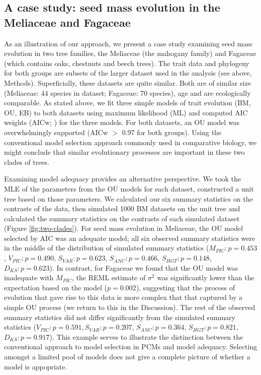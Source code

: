 \documentclass[a4paper,12pt]{article}
\begin{document}
\subsection{A case study: seed mass evolution in the Meliaceae and Fagaceae }
As an illustration of our approach, we present a case study examining seed mass evolution in two tree families, the Meliaceae (the mahogany family) and Fagaceae (which contains oaks, chestnuts and beech trees). The trait data and phylogeny for both groups are subsets of the larger dataset used in the analysis (see above, Methods). Superficially, these datasets are quite similar. Both are of similar size (Meliaceae: 44 species in dataset; Fagaceae: 70 species), age and are ecologically comparable. As stated above, we fit three simple models of trait evolution (BM, OU, EB) to both datasets using maximum likelihood (ML) and computed AIC weights (AICw; \citep{Akaike1974, aicweight}) for the three models. For both datasets, an OU model was overwhelmingly supported (AICw $>$ 0.97 for both groups). Using the conventional model selection approach commonly used in comparative biology, we might conclude that similar evolutionary processes are important in these two clades of trees.

Examining model adequacy provides an alternative perspective. We took the MLE of the parameters from the OU models for each dataset, constructed a unit tree based on those parameters. We calculated our six summary statistics on the contrasts of the data, then simulated 1000 BM datasets on the unit tree and calculated the summary statistics on the contrasts of each simulated dataset (Figure \ref{fig:two-clades}). For seed mass evolution in Meliaceae, the OU model selected by AIC was an adequate model; all six observed summary statistics were in the middle of the distribution of simulated summary statistics ($M_{PIC}: p=0.453$, $V_{PIC}: p=0.490$, $S_{VAR}: p=0.623$, $S_{ANC}:p=0.466$, $S_{HGT}: p=0.148$, $D_{KS}: p=0.623$). In contrast, for Fagaceae we found that the OU model was inadequate with $M_{PIC}$, the REML estimate of $\sigma^2$ was significantly lower than the expectation based on the model ($p=0.002$), suggesting that the process of evolution that gave rise to this data is more complex that that captured by a simple OU process (we return to this in the Discussion).  The rest of the observed summary statistics did not differ significantly from the simulated summary statistics ($V_{PIC}:p=0.591, S_{VAR}: p=0.207$, $S_{ANC}:p=0.364$, $S_{HGT}: p=0.821$, $D_{KS}: p=0.917$). This example serves to illustrate the distinction between the conventional approach to model selection in PCMs and model adequacy. Selecting amongst a limited pool of models does not give a complete picture of whether a model is appopriate.
\end{document}

